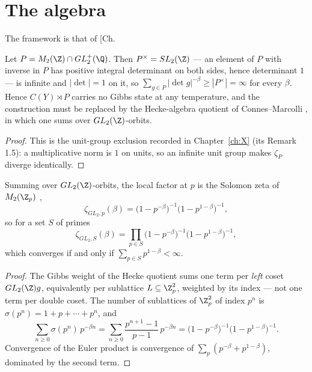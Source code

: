 \section{The algebra}

The framework is that of [Ch.\begin{proposition}\label{XXI:prop:units}
Let $P=M_2(\Z)\cap GL_2^+(\Q)$. Then $P^\times=SL_2(\Z)$ --- an element of $P$ with inverse
in $P$ has positive integral determinant on both sides, hence determinant $1$ --- is
infinite and $|\det|=1$ on it, so
$\sum_{g\in P}|\det g|^{-\beta}\ge|P^\times|=\infty$ for every $\beta$. Hence
$C(Y)\rtimes P$ carries no Gibbs state at any temperature, and the construction must be
replaced by the Hecke-algebra quotient of Connes--Marcolli \cite{ConnesMarcolliBook}, in which one sums over
$GL_2(\Z)$-orbits.
\end{proposition}

\begin{proof}
This is the unit-group exclusion recorded in Chapter~\ref{ch:X} (its Remark 1.5): a multiplicative norm
is $1$ on units, so an infinite unit group makes
$\zeta_P$ diverge identically.
\end{proof}

\begin{proposition}\label{XXI:prop:solomon}
Summing over $GL_2(\Z)$-orbits, the local factor at $p$ is the Solomon zeta of $M_2(\Z_p)$
\cite{Solomon},
\[
\zeta_{GL_2,p}(\beta)=\bigl(1-p^{-\beta}\bigr)^{-1}\bigl(1-p^{1-\beta}\bigr)^{-1},
\]
so for a set $S$ of primes
\begin{equation}\label{XXI:eq:zetaGL2}
\zeta_{GL_2,S}(\beta)=\prod_{p\in S}\bigl(1-p^{-\beta}\bigr)^{-1}\bigl(1-p^{1-\beta}\bigr)^{-1},
\end{equation}
which converges if and only if $\sum_{p\in S}p^{1-\beta}<\infty$.
\end{proposition}

\begin{proof}
The Gibbs weight of the Hecke quotient sums one term per \emph{left} coset $GL_2(\Z)g$,
equivalently per sublattice $L\subseteq\Z_p^2$, weighted by its index \cite{ConnesMarcolliBook} --- not one
term per double coset. The number of sublattices of $\Z_p^2$ of index $p^n$ is
$\sigma(p^n)=1+p+\cdots+p^n$, and
\[
\sum_{n\ge0}\sigma(p^n)\,p^{-\beta n}
=\sum_{n\ge0}\frac{p^{n+1}-1}{p-1}\,p^{-\beta n}
=\bigl(1-p^{-\beta}\bigr)^{-1}\bigl(1-p^{1-\beta}\bigr)^{-1}.
\]
Convergence of the Euler product
is convergence of $\sum_p(p^{-\beta}+p^{1-\beta})$, dominated by the second term.
\end{proof}

